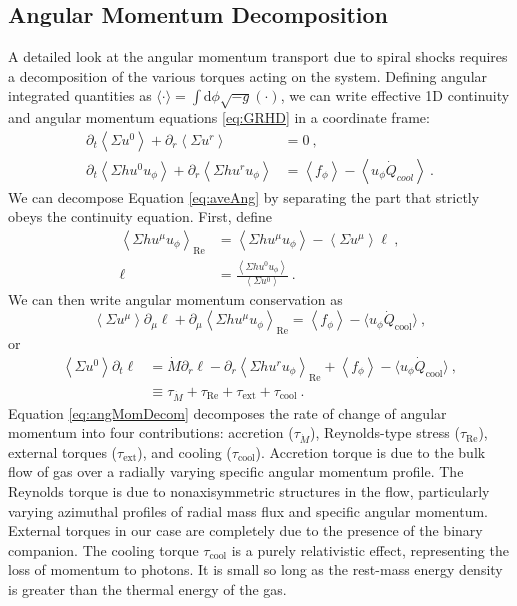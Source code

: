 \documentclass{emulateapj}
\newcommand{\Sig}{\Sigma}
\newcommand{\dd}{\mbox{d}}
\newcommand{\ave}[1]{\left \langle #1 \right \rangle}
\newcommand{\avet}[1]{ \langle #1 \rangle}
\newcommand{\aveRe}[1]{\left \langle #1 \right \rangle_\text{Re}}
\begin{document}
\subsection{Angular Momentum Decomposition}
\label{subsec:angMomDecom}

A detailed look at the angular momentum transport due to spiral shocks requires a decomposition of the various torques acting on the system. Defining angular integrated quantities as $\avet{\cdot} = \int \dd \phi \sqrt{-g} (\cdot)$, we can write effective 1D continuity and angular momentum equations \eqref{eq:GRHD} in a coordinate frame:
\begin{align}
	\partial_t \ave{\Sig u^0} + \partial_r \ave{\Sig u^r} &= 0 \ ,\label{eq:aveAng}\\
	\partial_t \ave{\Sig h u^0 u_\phi} + \partial_r \ave{\Sig h u^r u_\phi} &= \ave{f_\phi}- \ave{u_\phi \dot{Q}_{cool}} \ .\nonumber
\end{align} 
We can decompose Equation \eqref{eq:aveAng} by separating the part that strictly obeys the continuity equation.  First, define
\begin{align*}
	\aveRe{\Sig h u^\mu u_\phi} &= \ave{\Sig h u^\mu u_\phi} - \ave{\Sig u^\mu} \ell \ , \\
	\ell &= \frac{\ave{\Sig h u^0 u_\phi}}{\ave{\Sig u^0} } \ .
\end{align*}
We can then write angular momentum conservation as
\begin{equation}
	\ave{\Sig u^\mu} \partial_\mu \ell + \partial_\mu \aveRe{\Sig h u^\mu u_\phi} =  \ave{f_\phi}- \langle u_\phi \dot{Q}_\text{cool} \rangle \ , 
\end{equation}
or
\begin{align}
	\ave{\Sig u^0} \partial_t \ell &= \dot{M} \partial_r \ell -  \partial_r \aveRe{\Sig h u^r u_\phi} +  \ave{f_\phi}- \langle u_\phi \dot{Q}_\text{cool} \rangle \ , \nonumber \\
	&\equiv \tau_{\dot{M}} + \tau_\text{Re} + \tau_\text{ext} + \tau_\text{cool} \ . \label{eq:angMomDecom}
\end{align} 
Equation \eqref{eq:angMomDecom} decomposes the rate of change of angular momentum into four contributions: accretion ($\tau_{\dot{M}}$), Reynolds-type stress ($\tau_\text{Re}$), external torques ($\tau_\text{ext}$), and cooling ($\tau_\text{cool}$).  Accretion torque is due to the bulk flow of gas over a radially varying specific angular momentum profile. The Reynolds torque is due to nonaxisymmetric structures in the flow, particularly varying azimuthal profiles of radial mass flux and specific angular momentum. External torques in our case are completely due to the presence of the binary companion. The cooling torque $\tau_\text{cool}$ is a purely relativistic effect, representing the loss of momentum to photons. It is small so long as the rest-mass energy density is greater than the thermal energy of the gas.
\end{document}
